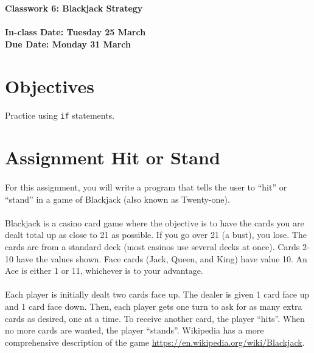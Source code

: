\documentclass[letter,10pt]{article}
\begin{document}
    
    \huge
    \textbf{Classwork 6: Blackjack Strategy}
    \normalsize
    \\ ~~ \\
    \textbf{In-class Date: Tuesday 25 March} \\
    \textbf{Due Date: Monday 31 March}
    
    \section*{Objectives}
    \paragraph{}Practice using \texttt{if} statements.
    
    \section*{Assignment Hit or Stand}
    \paragraph{}For this assignment, you will write a program that tells the user to ``hit'' or ``stand'' in a game of Blackjack (also known as Twenty-one).
    \paragraph{}Blackjack is a casino card game where the objective is to have the cards you are dealt total up as close to 21 as possible. If you go over 21 (a bust), you lose. The cards are from a standard deck (most casinos use several decks at once). Cards 2-10 have the values shown. Face cards (Jack, Queen, and King) have value 10. An Ace is either 1 or 11, whichever is to your advantage.
    \paragraph{}Each player is initially dealt two cards face up. The dealer is given 1 card face up and 1 card face down. Then, each player gets one turn to ask for as many extra cards as desired, one at a time. To receive another card, the player ``hits''. When no more cards are wanted, the player ``stands''. Wikipedia has a more comprehensive description of the game \url{https://en.wikipedia.org/wiki/Blackjack}.
\end{document}
